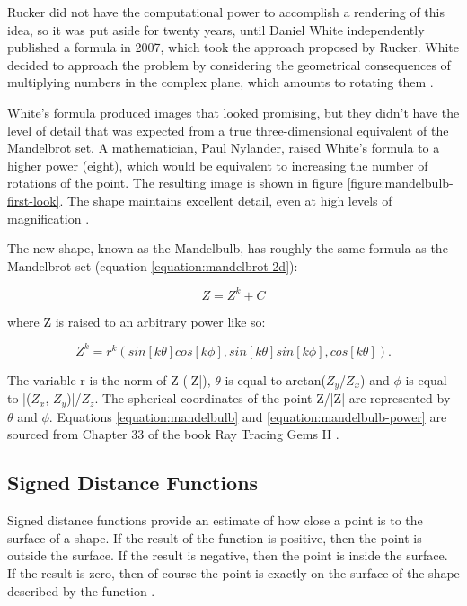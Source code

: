 Rucker did not have the computational power to accomplish a rendering of this idea, so it was put aside for twenty years, until Daniel White independently published a formula in 2007, which took the approach proposed by Rucker. White decided to approach the problem by considering the geometrical consequences of multiplying numbers in the complex plane, which amounts to rotating them \cite{aron2009mandelbulb}.\newline

White's formula produced images that looked promising, but they didn't have the level of detail that was expected from a true three-dimensional equivalent of the Mandelbrot set. A mathematician, Paul Nylander, raised White's formula to a higher power (eight), which would be equivalent to increasing the number of rotations of the point. The resulting image is shown in figure \ref{figure:mandelbulb-first-look}. The shape maintains excellent detail, even at high levels of magnification \cite {aron2009mandelbulb}.

The new shape, known as the Mandelbulb, has roughly the same formula as the Mandelbrot set (equation \ref{equation:mandelbrot-2d}):

\begin{equation} \label{equation:mandelbulb}
	Z = {Z^k} + C
\end{equation}

where Z is raised to an arbitrary power like so:

\begin{equation} \label{equation:mandelbulb-power}
	{Z^k} = {r^k}(sin[k\theta]cos[k\phi], sin[k\theta]sin[k\phi], cos[k\theta]).
\end{equation}

The variable r is the norm of Z (|Z|), $\theta$ is equal to arctan($Z_y$/$Z_x$) and $\phi$ is equal to |($Z_x$, $Z_y$)|/$Z_z$. The spherical coordinates of the point Z/|Z| are represented by $\theta$ and $\phi$. Equations \ref{equation:mandelbulb} and \ref{equation:mandelbulb-power} are sourced from Chapter 33 of the book Ray Tracing Gems II \cite{marrs2021ray}.

\subsection{Signed Distance Functions}

Signed distance functions provide an estimate of how close a point is to the surface of a shape. If the result of the function is positive, then the point is outside the surface. If the result is negative, then the point is inside the surface. If the result is zero, then of course the point is exactly on the surface of the shape described by the function \cite{roblesprocedural}.\newline

